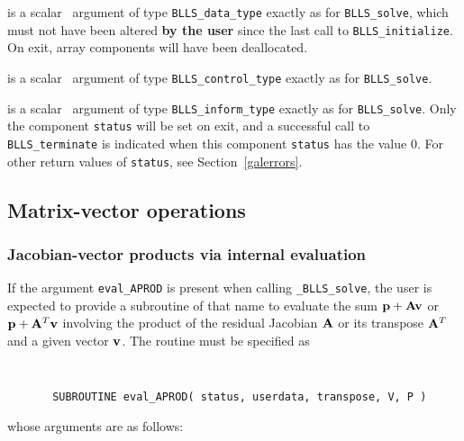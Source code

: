 \documentclass{galahad}
\newcommand{\packagename}{BLLS}
\newcommand{\fullpackagename}{\libraryname\_\packagename}
\newcommand{\solver}{{\tt \fullpackagename\_solve}}
\begin{document}
\vspace*{-3mm}
\begin{description}

 is a scalar \intentinout\ argument of type
{\tt \packagename\_data\_type}
exactly as for
{\tt \packagename\_solve},
which must not have been altered {\bf by the user} since the last call to
{\tt \packagename\_initialize}.
On exit, array components will have been deallocated.

 is a scalar \intentin\ argument of type
{\tt \packagename\_control\_type}
exactly as for
{\tt \packagename\_solve}.

 is a scalar \intentout\ argument of type
{\tt \packagename\_inform\_type}
exactly as for
{\tt \packagename\_solve}.
Only the component {\tt status} will be set on exit, and a
successful call to
{\tt \packagename\_terminate}
is indicated when this  component {\tt status} has the value 0.
For other return values of {\tt status}, see Section~\ref{galerrors}.

\end{description}



\subsection{Matrix-vector operations\label{fdv}}


\subsubsection{Jacobian-vector products via internal evaluation\label{jvp}}

If the argument {\tt eval\_APROD} is present when calling \solver, the
user is expected to provide a subroutine of that name to evaluate the
sum ${\mathbf{p}} + {\mathbf{A}} {\mathbf{v}}$ or ${\mathbf{p}} + {\mathbf{A}}^T{\mathbf{v}}$ involving the
product of the residual Jacobian ${\mathbf{A}}$ or its transpose ${\mathbf{A}}^T$
and a given vector ${\mathbf{v}}$.
The routine must be specified as

\def\baselinestretch{0.8}
{\tt
\begin{verbatim}
       SUBROUTINE eval_APROD( status, userdata, transpose, V, P )
\end{verbatim} }
\def\baselinestretch{1.0}
\noindent whose arguments are as follows:
\end{document}
